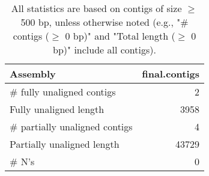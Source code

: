 \documentclass[12pt,a4paper]{article}
\begin{document}
\begin{table}[ht]
\begin{center}
\caption{All statistics are based on contigs of size $\geq$ 500 bp, unless otherwise noted (e.g., "\# contigs ($\geq$ 0 bp)" and "Total length ($\geq$ 0 bp)" include all contigs).}
\begin{tabular}{|l*{1}{|r}|}
\hline
Assembly & final.contigs \\ \hline
\# fully unaligned contigs & 2 \\ \hline
Fully unaligned length & 3958 \\ \hline
\# partially unaligned contigs & 4 \\ \hline
Partially unaligned length & 43729 \\ \hline
\# N's & 0 \\ \hline
\end{tabular}
\end{center}
\end{table}
\end{document}
